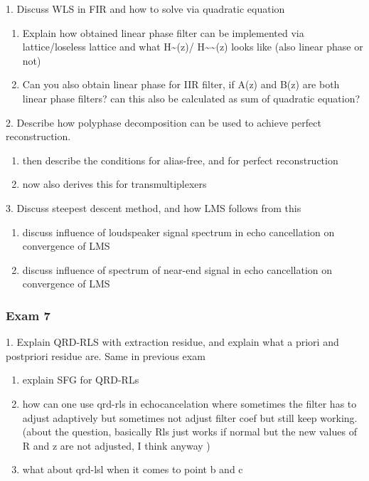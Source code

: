 \documentclass[
  a4paper,
  ,captions=tableheading
]{scrartcl}
\providecommand{\tightlist}{%
  \setlength{\itemsep}{0pt}\setlength{\parskip}{0pt}}
\begin{document}
1. Discuss WLS in FIR and how to solve via quadratic equation

\begin{enumerate}
\def\labelenumi{\arabic{enumi}.}
\tightlist
\item
  Explain how obtained linear phase filter can be implemented via
  lattice/loseless lattice and what H\textasciitilde(z)/
  H\textasciitilde\textasciitilde(z) looks like (also linear phase or
  not)\\
\item
  Can you also obtain linear phase for IIR filter, if A(z) and B(z) are
  both linear phase filters? can this also be calculated as sum of
  quadratic equation?
\end{enumerate}

2. Describe how polyphase decomposition can be used to achieve perfect
reconstruction.

\begin{enumerate}
\def\labelenumi{\arabic{enumi}.}
\tightlist
\item
  then describe the conditions for alias-free, and for perfect
  reconstruction\\
\item
  now also derives this for transmultiplexers
\end{enumerate}

3. Discuss steepest descent method, and how LMS follows from this

\begin{enumerate}
\def\labelenumi{\arabic{enumi}.}
\tightlist
\item
  discuss influence of loudspeaker signal spectrum in echo cancellation
  on convergence of LMS\\
\item
  discuss influence of spectrum of near-end signal in echo cancellation
  on convergence of LMS
\end{enumerate}

\subsubsection{Exam 7}\label{exam-7}

1. Explain QRD-RLS with extraction residue, and explain what a priori
and postpriori residue are. Same in previous exam

\begin{enumerate}
\def\labelenumi{\arabic{enumi}.}
\tightlist
\item
  explain SFG for QRD-RLs\\
\item
  how can one use qrd-rls in echocancelation where sometimes the filter
  has to adjust adaptively but sometimes not adjust filter coef but
  still keep working.(about the question, basically Rls just works if
  normal but the new values of R and z are not adjusted, I think anyway
  )\\
\item
  what about qrd-lsl when it comes to point b and c
\end{enumerate}
\end{document}
